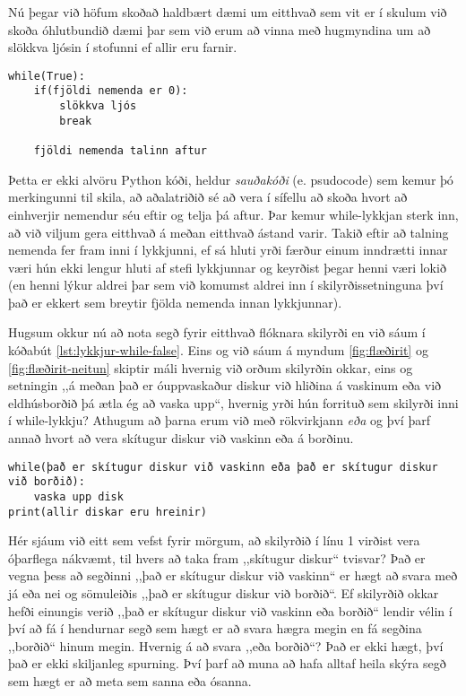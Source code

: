 Nú þegar við höfum skoðað haldbært dæmi um eitthvað sem vit er í skulum við skoða óhlutbundið dæmi þar sem við erum að vinna með hugmyndina um að slökkva ljósin í stofunni ef allir eru farnir.

\begin{lstlisting}
while(True):
	if(fjöldi nemenda er 0):
		slökkva ljós
		break
		
	fjöldi nemenda talinn aftur
\end{lstlisting}
\lstset{style=venjulegt}

Þetta er ekki alvöru Python kóði, heldur \emph{sauðakóði} (e. psudocode) sem kemur þó merkingunni til skila, að aðalatriðið sé að vera í sífellu að skoða hvort að einhverjir nemendur séu eftir og telja þá aftur.
Þar kemur while-lykkjan sterk inn, að við viljum gera eitthvað á meðan eitthvað ástand varir.
Takið eftir að talning nemenda fer fram inni í lykkjunni, ef sá hluti yrði færður einum inndrætti innar væri hún ekki lengur hluti af stefi lykkjunnar og keyrðist þegar henni væri lokið (en henni lýkur aldrei þar sem við komumst aldrei inn í skilyrðissetninguna því það er ekkert sem breytir fjölda nemenda innan lykkjunnar).

Hugsum okkur nú að nota segð fyrir eitthvað flóknara skilyrði en við sáum í kóðabút \ref{lst:lykkjur-while-false}.
Eins og við sáum á myndum \ref{fig:flæðirit} og \ref{fig:flæðirit-neitun} skiptir máli hvernig við orðum skilyrðin okkar, eins og setningin ,,á meðan það er óuppvaskaður diskur við hliðina á vaskinum eða við eldhúsborðið þá ætla ég að vaska upp“, hvernig yrði hún forrituð sem skilyrði inni í while-lykkju?
Athugum að þarna erum við með rökvirkjann \emph{eða} og því þarf annað hvort að vera skítugur diskur við vaskinn eða á borðinu.
\begin{lstlisting}[caption=while-lykkja óhlutbundin til að sýna rökvirkja, label=lst:lykkjur-while-or]
while(það er skítugur diskur við vaskinn eða það er skítugur diskur við borðið):
	vaska upp disk
print(allir diskar eru hreinir)
\end{lstlisting}
\lstset{style=venjulegt}

Hér sjáum við eitt sem vefst fyrir mörgum, að skilyrðið í línu 1 virðist vera óþarflega nákvæmt, til hvers að taka fram ,,skítugur diskur“ tvisvar?
Það er vegna þess að segðinni ,,það er skítugur diskur við vaskinn“ er hægt að svara með já eða nei og sömuleiðis ,,það er skítugur diskur við borðið“.
Ef skilyrðið okkar hefði einungis verið ,,það er skítugur diskur við vaskinn eða borðið“ lendir vélin í því að fá í hendurnar segð sem hægt er að svara hægra megin en fá segðina ,,borðið“ hinum megin.
Hvernig á að svara ,,eða borðið“?
Það er ekki hægt, því það er ekki skiljanleg spurning.
Því þarf að muna að hafa alltaf heila skýra segð sem hægt er að meta sem sanna eða ósanna.

